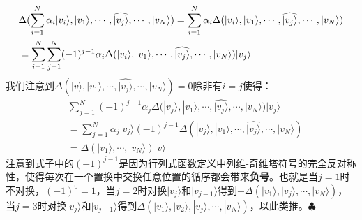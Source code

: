 \documentclass[mathserif,hyperref,UTF8,openany,b5paper]{ctexbook}
\begin{document}
\begin{align}
&\Delta(\sum_{i=1}^N\alpha_i|v_i\rangle,|v_1\rangle,\cdots,\widehat{|v_j\rangle},\cdots,|v_N\rangle)=\sum_{i=1}^N\alpha_i\Delta(|v_i\rangle,|v_1\rangle,\cdots,\widehat{|v_j\rangle},\cdots,|v_N\rangle)\notag\\
&=\sum_{i=1}^N\sum_{j=1}^N(-1)^{j-1}\alpha_i\Delta(|v_i\rangle,|v_1\rangle,\cdots,\widehat{|v_j\rangle},\cdots,|v_N\rangle)|v_j\rangle
\end{align}
我们注意到$\Delta(|v\rangle,|v_1\rangle,\cdots,\widehat{|v_j\rangle},\cdots,|v_N\rangle)=0$除非有$i=j$使得：
\begin{align}
&\sum_{j=1}^N(-1)^{j-1}\alpha_j\Delta(|v_j\rangle,|v_1\rangle,\cdots,\widehat{|v_j\rangle},\cdots,|v_N\rangle)|v_j\rangle\\
&=\sum_{j=1}^N\alpha_j|v_j\rangle (-1)^{j-1}\Delta(|v_j\rangle,|v_1\rangle,\cdots,\widehat{|v_j\rangle},\cdots,|v_N\rangle)\\
&=\Delta(|v_1\rangle,\cdots,|v_N\rangle)|v\rangle
\end{align}注意到式子中的$(-1)^{j-1}$是因为行列式函数定义中列维-奇维塔符号的完全反对称性，使得每次在一个置换中交换任意位置的循序都会带来\textbf{负号}。也就是当$j=1$时不对换，$(-1)^{0}=1$，当$j=2$时对换$|v_j\rangle$和$|v_{j-1}\rangle$得到$-\Delta(|v_1\rangle,|v_j\rangle,\cdots,|v_N\rangle)$，当$j=3$时对换$|v_j\rangle$和$|v_{j-1}\rangle$得到$\Delta(|v_1\rangle,|v_2\rangle,|v_j\rangle,\cdots,|v_N\rangle)$，以此类推。$\clubsuit$
\end{document}
